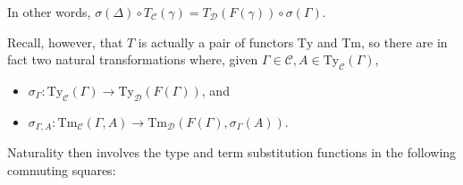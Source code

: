 \documentclass{article}
\renewcommand{\_}{\textrm{\textscale{.5}{\textunderscore}}}
\newcommand{\nt}{\sigma}
\newcommand{\Tm}{\mathrm{Tm}}
\newcommand{\Ty}{\mathrm{Ty}}
\theoremstyle{definition}
\theoremstyle{plain}
\begin{document}
In other words, $\nt(\Delta) \circ T_{\mathcal{C}}(\gamma) = T_{\mathcal{D}}(F(\gamma)) \circ \nt(\Gamma)$.

Recall, however, that $T$ is actually a pair of functors $\Ty$ and $\Tm$,
so there are in fact two natural transformations where, given $\Gamma \in \mathcal{C}, A \in \Ty_{\mathcal{C}}(\Gamma)$,

\begin{itemize}
    \item $\nt_{\Gamma} : \Ty_{\mathcal{C}}(\Gamma) \to \Ty_{\mathcal{D}}(F(\Gamma))$, and
    \item $\nt_{\Gamma, A} : \Tm_{\mathcal{C}}(\Gamma, A) \to \Tm_{\mathcal{D}}(F(\Gamma), \sigma_{\Gamma}(A))$.
\end{itemize}

Naturality then involves the type and term substitution functions in the following commuting squares:

\begin{multicols}{2}
\begin{center}
\end{center}

\begin{center}
\end{center}
\end{multicols}
\end{document}
